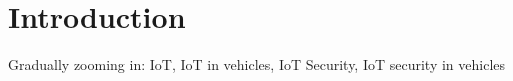 
\section{Introduction}


Gradually zooming in: IoT, IoT in vehicles, IoT Security, IoT
security in vehicles \cite{Navet2017,Alaba2017}
